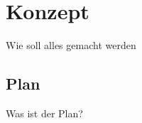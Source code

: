 \chapter{Konzept}%
       

\label{cha:Konzept}

Wie soll alles gemacht werden


\section{Plan}

Was ist der Plan?

